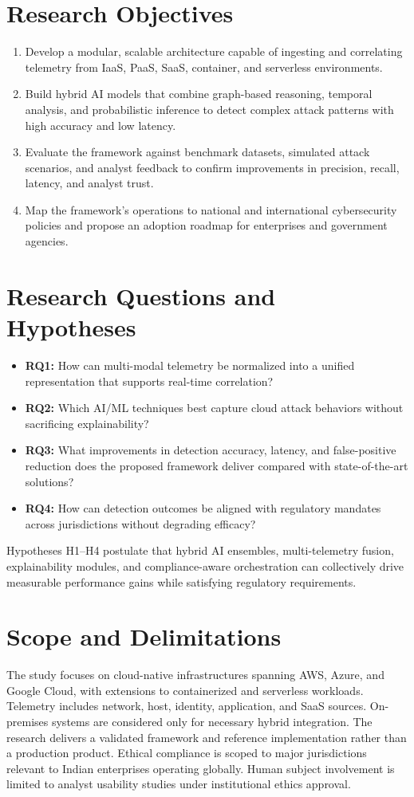 \section{Research Objectives}
\begin{enumerate}[label=\textbf{O\arabic*}]
    \item Develop a modular, scalable architecture capable of ingesting and correlating telemetry from IaaS, PaaS, SaaS, container, and serverless environments.
    \item Build hybrid AI models that combine graph-based reasoning, temporal analysis, and probabilistic inference to detect complex attack patterns with high accuracy and low latency.
    \item Evaluate the framework against benchmark datasets, simulated attack scenarios, and analyst feedback to confirm improvements in precision, recall, latency, and analyst trust.
    \item Map the framework's operations to national and international cybersecurity policies and propose an adoption roadmap for enterprises and government agencies.
\end{enumerate}

\section{Research Questions and Hypotheses}
\begin{itemize}
    \item \textbf{RQ1:} How can multi-modal telemetry be normalized into a unified representation that supports real-time correlation?
    \item \textbf{RQ2:} Which AI/ML techniques best capture cloud attack behaviors without sacrificing explainability?
    \item \textbf{RQ3:} What improvements in detection accuracy, latency, and false-positive reduction does the proposed framework deliver compared with state-of-the-art solutions?
    \item \textbf{RQ4:} How can detection outcomes be aligned with regulatory mandates across jurisdictions without degrading efficacy?
\end{itemize}
Hypotheses H1--H4 postulate that hybrid AI ensembles, multi-telemetry fusion, explainability modules, and compliance-aware orchestration can collectively drive measurable performance gains while satisfying regulatory requirements.

\section{Scope and Delimitations}
The study focuses on cloud-native infrastructures spanning AWS, Azure, and Google Cloud, with extensions to containerized and serverless workloads. Telemetry includes network, host, identity, application, and SaaS sources. On-premises systems are considered only for necessary hybrid integration. The research delivers a validated framework and reference implementation rather than a production product. Ethical compliance is scoped to major jurisdictions relevant to Indian enterprises operating globally. Human subject involvement is limited to analyst usability studies under institutional ethics approval.


